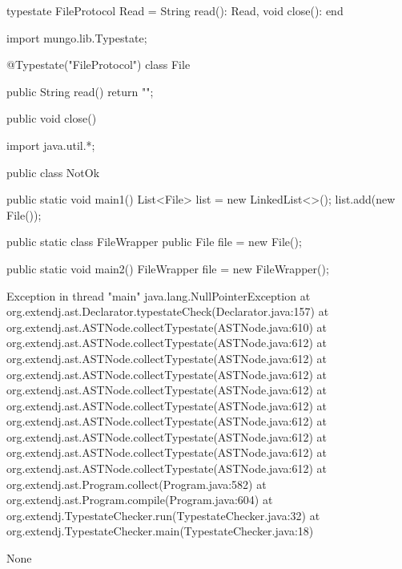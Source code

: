 \begin{code}
typestate FileProtocol {
  Read = {
    String read(): Read,
    void close(): end
  }
}\end{code}

\begin{code}
import mungo.lib.Typestate;

@Typestate("FileProtocol")
class File {

  public String read() {
    return "";
  }

  public void close() {
  }

}\end{code}

\begin{code}
import java.util.*;

public class NotOk {
  public static void main1() {
    List<File> list = new LinkedList<>();
    list.add(new File());
  }
  
  public static class FileWrapper {
    public File file = new File();
  }
  
  public static void main2() {
    FileWrapper file = new FileWrapper();
  }
}\end{code}

\lstset{language=,caption=Original Mungo output}
\begin{code}
Exception in thread "main" java.lang.NullPointerException
	at org.extendj.ast.Declarator.typestateCheck(Declarator.java:157)
	at org.extendj.ast.ASTNode.collectTypestate(ASTNode.java:610)
	at org.extendj.ast.ASTNode.collectTypestate(ASTNode.java:612)
	at org.extendj.ast.ASTNode.collectTypestate(ASTNode.java:612)
	at org.extendj.ast.ASTNode.collectTypestate(ASTNode.java:612)
	at org.extendj.ast.ASTNode.collectTypestate(ASTNode.java:612)
	at org.extendj.ast.ASTNode.collectTypestate(ASTNode.java:612)
	at org.extendj.ast.ASTNode.collectTypestate(ASTNode.java:612)
	at org.extendj.ast.ASTNode.collectTypestate(ASTNode.java:612)
	at org.extendj.ast.ASTNode.collectTypestate(ASTNode.java:612)
	at org.extendj.ast.ASTNode.collectTypestate(ASTNode.java:612)
	at org.extendj.ast.Program.collect(Program.java:582)
	at org.extendj.ast.Program.compile(Program.java:604)
	at org.extendj.TypestateChecker.run(TypestateChecker.java:32)
	at org.extendj.TypestateChecker.main(TypestateChecker.java:18)
\end{code}

\lstset{language=,caption=New Mungo output}
\begin{code}
None
\end{code}

